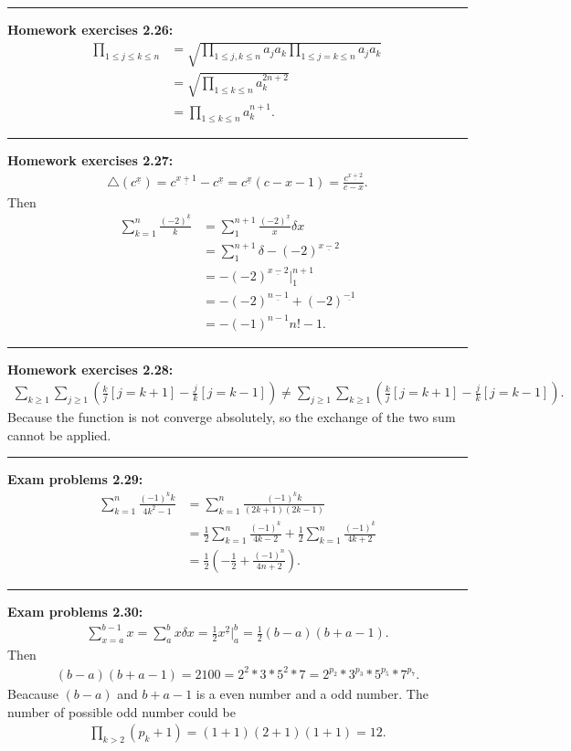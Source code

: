\documentclass{article}
\begin{document}
\noindent\rule{\textwidth}{0.4pt}
\textbf{Homework exercises 2.26:}
\begin{align}
\prod_{1 \le j \le k \le n} &= \sqrt{\prod_{1 \le j,k\le n}a_j a_k \prod_{1 \le j = k \le n}a_j a_k} \\
			    &= \sqrt{\prod_{1 \le k \le n} a_k^{2n+2}} \\
			    &= \prod_{1 \le k \le n} a_k^{n+1}.
\end{align}

\noindent\rule{\textwidth}{0.4pt}
\textbf{Homework exercises 2.27:}
\begin{align}
\bigtriangleup (c^{\underline x}) = c^{\underline {x+1}} - c^{\underline {x}} =  c^{\underline {x}}(c - x - 1) = \frac{c^{\underline {x+2}}}{c-x}.
\end{align}
Then
\begin{align}
\sum_{k=1}^n \frac{(-2)^{\underline k}}{k} &= \sum\nolimits_1^{n+1} \frac{(-2)^{\underline x}}{x} \delta x \\
					   &= \sum\nolimits_1^{n+1} \delta -(-2)^{\underline {x-2}} \\
					   &= -(-2)^{\underline {x-2}} \Big|_1^{n+1} \\
					   &= -(-2)^{\underline {n-1}} + (-2) ^{\underline {-1}} \\
					   &= -(-1)^{n-1} n! - 1.
\end{align}

\noindent\rule{\textwidth}{0.4pt}
\textbf{Homework exercises 2.28:}
\begin{align}
\sum_{k\ge 1} \sum_{j \ge 1} (\frac{k}{j}[j = k+1] - \frac{j}{k}[j = k - 1]) \neq \sum_{j \ge 1} \sum_{k \ge 1} (\frac{k}{j}[j = k+1] - \frac{j}{k}[j = k - 1]).
\end{align}
Because the function is not converge absolutely, so the exchange of the two sum cannot be applied.

\noindent\rule{\textwidth}{0.4pt}
\textbf{Exam problems 2.29:}
\begin{align}
\sum_{k=1}^n \frac{(-1)^k k}{4k^2 - 1} &= \sum_{k=1}^n \frac{(-1)^k k}{(2k+1)(2k-1)} \\
				       &=  \frac{1}{2}\sum_{k=1}^n \frac{(-1)^k}{4k-2} + \frac{1}{2}\sum_{k=1}^n \frac{(-1)^k}{4k+2} \\
				       &= \frac{1}{2}(-\frac{1}{2} + \frac{(-1)^n}{4n+2}).
\end{align}

\noindent\rule{\textwidth}{0.4pt}
\textbf{Exam problems 2.30:}
\begin{align}
\sum_{x = a}^{b-1} x = \sum \nolimits_a^b x \delta x = \frac{1}{2}x^{\underline 2} \Big|_a^b  = \frac{1}{2}(b-a)(b+a-1).
\end{align}
Then 
\begin{align}
(b-a)(b+a-1) = 2100 = 2^2 * 3 * 5^2 * 7 = 2^{p_2} * 3^{p_3} * 5^{p_5}* 7^{p_7}.
\end{align}
Beacause $(b-a)$ and $b+a-1$ is a even number and a odd number.
The number of possible odd number could be 
\begin{align}
\prod_{k>2}(p_k + 1) = (1+1)(2+1)(1+1) = 12.
\end{align}
\end{document}

